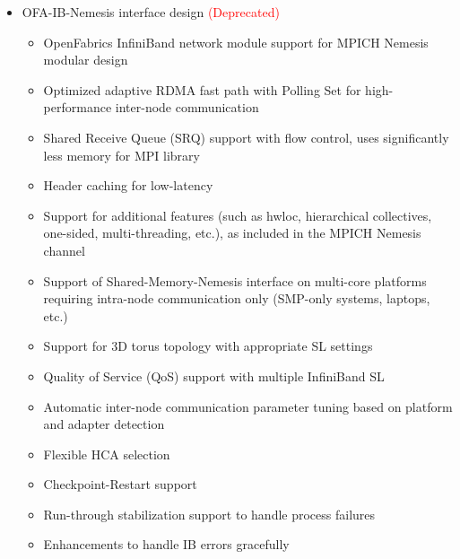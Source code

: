 \begin{itemize}
\item  OFA-IB-Nemesis interface design  \textcolor{red}{(Deprecated)}
   \begin{itemize} 
      \item  OpenFabrics InfiniBand network module support for 
           MPICH Nemesis modular design    
      \item  Optimized adaptive RDMA fast path with Polling Set for high-performance
           inter-node communication
      \item  Shared Receive Queue (SRQ) support with flow control,
           uses significantly less memory for MPI library 
      \item  Header caching for low-latency
      \item  Support for additional features (such as hwloc, hierarchical 
           collectives, one-sided, multi-threading, etc.), as included 
           in the MPICH Nemesis channel
      \item  Support of Shared-Memory-Nemesis interface 
	   on multi-core platforms  requiring intra-node communication only 
	   (SMP-only systems, laptops,  etc.)
      \item  Support for 3D torus topology 
           with appropriate SL settings
      \item  Quality of Service (QoS) support with multiple InfiniBand SL 
      \item  Automatic inter-node communication parameter tuning based on platform and adapter detection
      \item  Flexible HCA selection 
      \item  Checkpoint-Restart support
      \item  Run-through stabilization support to handle process failures 
      \item  Enhancements to handle IB errors gracefully 
    

\end{itemize}
\end{itemize}
